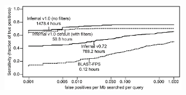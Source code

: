 \documentclass{bioinfo}
\begin{document}
\begin{application}
\begin{figure}[h]
\centerline{\includegraphics[width=3.1in]{figs/roc-short}}

\label{Fig:01}
\end{figure}

%
%

%


\end{application}
\end{document}
